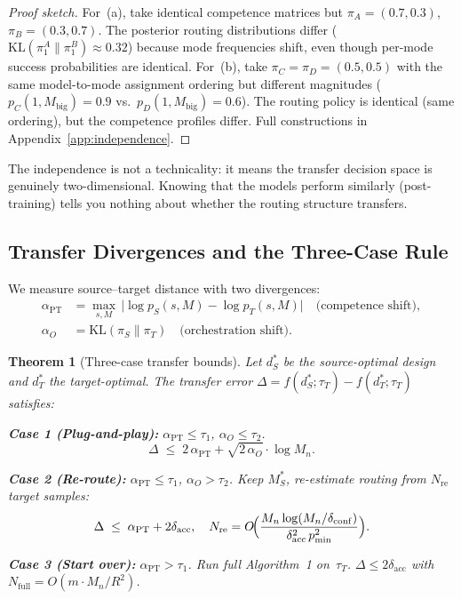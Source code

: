 \documentclass[11pt]{article}
\newtheorem{theorem}{Theorem}
\newtheorem{proof}{Proof}
\newcommand{\KL}{\mathrm{KL}}
\newcommand{\Mn}{M_n}
\newcommand{\pmin}{p_{\min}}
\newcommand{\dacc}{\delta_{\mathrm{acc}}}
\newcommand{\dconf}{\delta_{\mathrm{conf}}}
\begin{document}
\begin{proof}[Proof sketch]
For~(a), take identical competence matrices but
$\pi_A = (0.7, 0.3)$, $\pi_B = (0.3, 0.7)$.
The posterior routing distributions differ
($\KL(\pi_1^A \| \pi_1^B) \approx 0.32$) because mode frequencies
shift, even though per-mode success probabilities are identical.
For~(b), take $\pi_C = \pi_D = (0.5, 0.5)$ with the same model-to-mode
assignment ordering but different magnitudes
($p_C(1,M_{\mathrm{big}}) = 0.9$ vs.\
$p_D(1,M_{\mathrm{big}}) = 0.6$).
The routing policy is identical (same ordering), but the competence
profiles differ.
Full constructions in Appendix~\ref{app:independence}.
\end{proof}

The independence is not a technicality: it means the transfer decision
space is genuinely two-dimensional.  Knowing that the models perform
similarly (post-training) tells you nothing about whether the routing
structure transfers.

\subsection{Transfer Divergences and the Three-Case Rule}
\label{sec:transfer-rule}

We measure source--target distance with two divergences:
\begin{align}
  \alpha_{\mathrm{PT}} &= \max_{s,M}\,
    \bigl|\log p_S(s,M) - \log p_T(s,M)\bigr|
    \quad \text{(competence shift)},
    \label{eq:alpha-pt} \\
  \alpha_O &= \KL(\pi_S \| \pi_T)
    \quad \text{(orchestration shift)}.
    \label{eq:alpha-o}
\end{align}

\begin{theorem}[Three-case transfer bounds]
\label{thm:transfer}
Let $d_S^*$ be the source-optimal design and $d_T^*$ the target-optimal.
The transfer error
$\Delta = f(d_S^*;\tau_T) - f(d_T^*;\tau_T)$ satisfies:

\medskip
\noindent\textbf{Case 1 (Plug-and-play):}
$\alpha_{\mathrm{PT}} \le \tau_1$, $\alpha_O \le \tau_2$.
\begin{equation}
  \Delta \;\le\; 2\,\alpha_{\mathrm{PT}} + \sqrt{2\,\alpha_O}\cdot\log\Mn.
\end{equation}

\noindent\textbf{Case 2 (Re-route):}
$\alpha_{\mathrm{PT}} \le \tau_1$, $\alpha_O > \tau_2$.
Keep $M_S^*$, re-estimate routing from $N_{\mathrm{re}}$ target samples:
\begin{equation}
  \Delta \;\le\; \alpha_{\mathrm{PT}} + 2\dacc, \quad
  N_{\mathrm{re}} = O\!\Bigl(\frac{\Mn\log(\Mn/\dconf)}
    {\dacc^2\,\pmin^2}\Bigr).
\end{equation}

\noindent\textbf{Case 3 (Start over):}
$\alpha_{\mathrm{PT}} > \tau_1$.
Run full Algorithm~1 on~$\tau_T$.
$\Delta \le 2\dacc$ with $N_{\mathrm{full}} = O(m\cdot\Mn/R^2)$.
\end{theorem}
\end{document}

